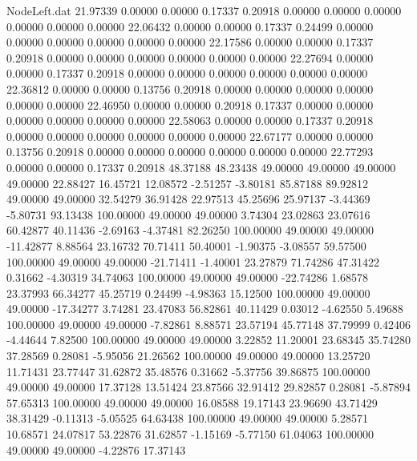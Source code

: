 \begin{filecontents}{NodeLeft.dat}
  21.97339    0.00000    0.00000     0.17337    0.20918    0.00000    0.00000    0.00000    0.00000    0.00000    0.00000
  22.06432    0.00000    0.00000     0.17337    0.24499    0.00000    0.00000    0.00000    0.00000    0.00000    0.00000
  22.17586    0.00000    0.00000     0.17337    0.20918    0.00000    0.00000    0.00000    0.00000    0.00000    0.00000
  22.27694    0.00000    0.00000     0.17337    0.20918    0.00000    0.00000    0.00000    0.00000    0.00000    0.00000
  22.36812    0.00000    0.00000     0.13756    0.20918    0.00000    0.00000    0.00000    0.00000    0.00000    0.00000
  22.46950    0.00000    0.00000     0.20918    0.17337    0.00000    0.00000    0.00000    0.00000    0.00000    0.00000
  22.58063    0.00000    0.00000     0.17337    0.20918    0.00000    0.00000    0.00000    0.00000    0.00000    0.00000
  22.67177    0.00000    0.00000     0.13756    0.20918    0.00000    0.00000    0.00000    0.00000    0.00000    0.00000
  22.77293    0.00000    0.00000     0.17337    0.20918   48.37188   48.23438   49.00000   49.00000   49.00000   49.00000
  22.88427   16.45721   12.08572    -2.51257   -3.80181   85.87188   89.92812   49.00000   49.00000   32.54279   36.91428
  22.97513   45.25696   25.97137    -3.44369   -5.80731   93.13438  100.00000   49.00000   49.00000    3.74304   23.02863
  23.07616   60.42877   40.11436    -2.69163   -4.37481   82.26250  100.00000   49.00000   49.00000  -11.42877    8.88564
  23.16732   70.71411   50.40001    -1.90375   -3.08557   59.57500  100.00000   49.00000   49.00000  -21.71411   -1.40001
  23.27879   71.74286   47.31422     0.31662   -4.30319   34.74063  100.00000   49.00000   49.00000  -22.74286    1.68578
  23.37993   66.34277   45.25719     0.24499   -4.98363   15.12500  100.00000   49.00000   49.00000  -17.34277    3.74281
  23.47083   56.82861   40.11429     0.03012   -4.62550    5.49688  100.00000   49.00000   49.00000   -7.82861    8.88571
  23.57194   45.77148   37.79999     0.42406   -4.44644    7.82500  100.00000   49.00000   49.00000    3.22852   11.20001
  23.68345   35.74280   37.28569     0.28081   -5.95056   21.26562  100.00000   49.00000   49.00000   13.25720   11.71431
  23.77447   31.62872   35.48576     0.31662   -5.37756   39.86875  100.00000   49.00000   49.00000   17.37128   13.51424
  23.87566   32.91412   29.82857     0.28081   -5.87894   57.65313  100.00000   49.00000   49.00000   16.08588   19.17143
  23.96690   43.71429   38.31429    -0.11313   -5.05525   64.63438  100.00000   49.00000   49.00000    5.28571   10.68571
  24.07817   53.22876   31.62857    -1.15169   -5.77150   61.04063  100.00000   49.00000   49.00000   -4.22876   17.37143

\end{filecontents}

